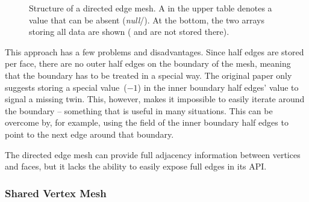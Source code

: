 \begin{figure}[t]
  \vspace{2mm}

  \caption{
    Structure of a directed edge mesh.
    A  in the upper table denotes a value that can be absent (\emph{null}/).
    At the bottom, the two arrays storing all data are shown ( and  are not stored there).
  }
  \label{fig:dem-structure}
\end{figure}

This approach has a few problems and disadvantages.
Since half edges are stored per face, there are no outer half edges on the boundary of the mesh, meaning that the boundary has to be treated in a special way.
The original paper only suggests storing a special value~($-1$) in the inner boundary half edges'  value to signal a missing twin.
This, however, makes it impossible to easily iterate around the boundary -- something that is useful in many situations.
This can be overcome by, for example, using the  field of the inner boundary half edges to point to the next edge around that boundary.

The directed edge mesh can provide full adjacency information between vertices and faces, but it lacks the ability to easily expose full edges in its API.

\newpage
\subsubsection*{Shared Vertex Mesh}

